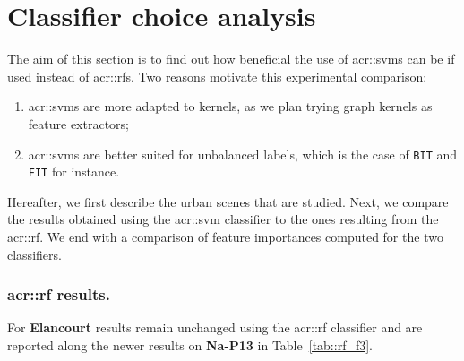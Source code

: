 \section{Classifier choice analysis}
    \label{sec::advanced_experiments::classifier}
    The aim of this section is to find out how beneficial the use of \glspl{acr::svm} can be if used instead of \glspl{acr::rf}.
    Two reasons motivate this experimental comparison:
    \begin{enumerate}[label=\roman*)]
        \item \glspl{acr::svm} are more adapted to kernels, as we plan trying graph kernels as feature extractors;
        \item \glspl{acr::svm} are better suited for unbalanced labels, which is the case of \texttt{BIT} and \texttt{FIT} for instance.
    \end{enumerate}
    Hereafter, we first describe the urban scenes that are studied.
    Next, we compare the results obtained using the \gls{acr::svm} classifier to the ones resulting from the \gls{acr::rf}.
    We end with a comparison of feature importances computed for the two classifiers.

    \subsubsection{\texorpdfstring{\acrshort*{acr::rf}}{RF} results.}
        \label{subsec::advanced_experiments::classifier::rf}
        For \textbf{Elancourt} results remain unchanged using the \gls{acr::rf} classifier and are reported along the newer results on \textbf{Na-P13} in Table~\ref{tab::rf_f3}.\\

